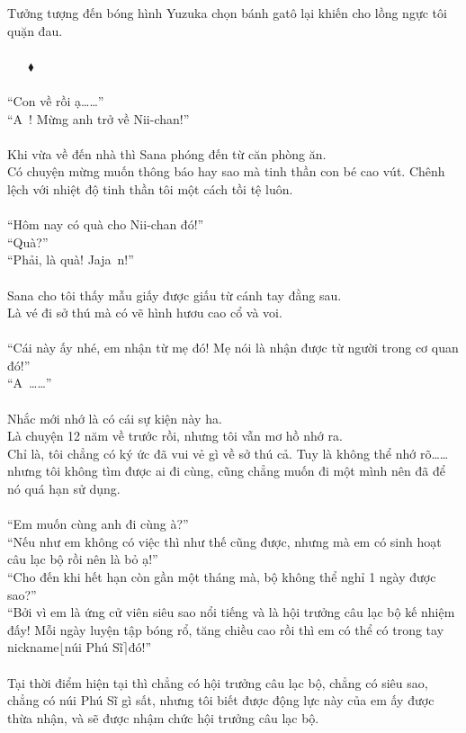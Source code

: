 \documentclass[12pt,a4paper, twosides]{book}
\begin{document}
Tưởng tượng đến bóng hình Yuzuka chọn bánh gatô lại khiến cho lồng ngực tôi quặn đau.\\
\\
     $\mathbin{\blacklozenge}$\\
\\
“Con về rồi ạ……”\\
“A~! Mừng anh trở về Nii-chan!”\\
\\
Khi vừa về đến nhà thì Sana phóng đến từ căn phòng ăn.\\
Có chuyện mừng muốn thông báo hay sao mà tinh thần con bé cao vút. Chênh lệch với nhiệt độ tinh thần tôi một cách tồi tệ luôn.\\
\\
“Hôm nay có quà cho Nii-chan đó!”\\
“Quà?”\\
“Phải, là quà! Jaja~n!”\\
\\
Sana cho tôi thấy mẫu giấy được giấu từ cánh tay đằng sau.\\
Là vé đi sở thú mà có vẽ hình hươu cao cổ và voi.\\
\\
“Cái này ấy nhé, em nhận từ mẹ đó! Mẹ nói là nhận được từ người trong cơ quan đó!”\\
“A~……”\\
\\
Nhắc mới nhớ là có cái sự kiện này ha.\\
Là chuyện 12 năm về trước rồi, nhưng tôi vẫn mơ hồ nhớ ra.\\
Chỉ là, tôi chẳng có ký ức đã vui vẻ gì về sở thú cả. Tuy là không thể nhớ rõ……nhưng tôi không tìm được ai đi cùng, cũng chẳng muốn đi một mình nên đã để nó quá hạn sử dụng.\\
\\
“Em muốn cùng anh đi cùng à?”\\
“Nếu như em không có việc thì như thế cũng được, nhưng mà em có sinh hoạt câu lạc bộ rồi nên là bỏ ạ!”\\
“Cho đến khi hết hạn còn gần một tháng mà, bộ không thể nghỉ 1 ngày được sao?”\\
“Bởi vì em là ứng cử viên siêu sao nổi tiếng và là hội trưởng câu lạc bộ kế nhiệm đấy! Mỗi ngày luyện tập bóng rổ, tăng chiều cao rồi thì em có thể có trong tay nickname$\lfloor$núi Phú Sĩ$\rceil$đó!”\\
\\
Tại thời điểm hiện tại thì chẳng có hội trưởng câu lạc bộ, chẳng có siêu sao, chẳng có núi Phú Sĩ gì sất, nhưng tôi biết được động lực này của em ấy được thừa nhận, và sẽ được nhậm chức hội trưởng câu lạc bộ.\\
\end{document}
